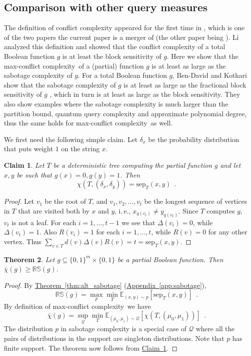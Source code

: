 \documentclass[11pt]{article}
\numberwithin{equation}{section}
\newtheorem{theorem}{Theorem}[section]
\newtheorem{claim}[theorem]{Claim}
\theoremstyle{definition}
\theoremstyle{plain}
\newcommand{\ie}{i.\,e.}
\newcommand{\expref}[2]{\hyperref[#2]{#1~\ref{#2}}}
\newcommand{\clQ}{\mathcal{Q}}
\newcommand{\RS}{\mathbb{RS}}
\newcommand{\sep}{\mathrm{sep}}
\newcommand{\E}{\mathbb{E}}
\newcommand{\ccc}{max-conflict complexity}
\begin{document}
\subsection{Comparison with other query measures}
The definition of conflict complexity appeared for the first time in \cite{DBLP:journals/corr/abs-1801-03285}, which is one of the two papers the current paper is a merger of (the other paper being \cite{DBLP:journals/corr/abs-1801-02226}). Li \cite{Li18} analyzed this definition and showed that the conflict complexity of a total Boolean function $g$ is at least the block sensitivity of $g$. Here we show 
that the \ccc \ of a (partial) function $g$ is at least as large as the sabotage complexity of $g$.  For a total Boolean function $g$, Ben-David 
and Kothari \cite{DBLP:conf/icalp/Ben-DavidK16} show that the sabotage complexity of $g$ is at least as large as the fractional block sensitivity of $g$ \cite{Aar08, Tal13, GSS16}, 
which in turn is at least as large as the block sensitivity.  They also show examples where the sabotage complexity is much larger than the partition bound, quantum query complexity 
and approximate polynomial degree, thus the same holds for \ccc \ as well.  

We first need the following simple claim.  Let $\delta_x$ be the probability distribution that puts weight $1$ on the string $x$.
\begin{claim}
\label{clm:sabotage}
Let $T$ be a deterministic tree computing the partial function $g$ and let $x,y$ be such that $g(x) = 0, g(y) =1$.  Then 
\[
\chi(T, (\delta_x, \delta_y)) = \sep_T(x,y) \enspace .
\]
\end{claim}

\begin{proof}
Let $v_1$ be the root of $T$, and $v_1, v_2, \ldots, v_t$ be the longest sequence of vertices in $T$ that are visited both by $x$ and $y$, \ie, 
$x_{q(v_t)} \ne y_{q(v_t)}$.  Since $T$ computes $g$, $v_t$ is not a leaf. For each $i=1, \ldots, t-1$ we see that $\Delta(v_i) = 0$, while $\Delta(v_t)=1$.  Also $R(v_i)=1$ for each $i=1, \ldots, t$, 
while $R(v)=0$ for any other vertex.  Thus $\sum_{v \in T} d(v) \Delta(v) R(v) = t = \sep_T(x,y)$.  
\end{proof}

\begin{theorem}
Let $g \subseteq \{0,1\}^m \times \{0,1\}$ be a partial
%
Boolean function.  Then $\bar \chi(g) \ge \RS(g)$.  
\end{theorem}

\begin{proof}
By \expref{Theorem}{thm:alt_sabotage} (\expref{Appendix}{app:sabotage}), 
\[
\RS(g) = \max_p \min_T \E_{(x,y) \sim p} [\sep_T(x,y)] \enspace .
\]
By definition of \ccc \ we have
\[
\bar \chi(g) = \sup_{\clQ} \min_T \E_{(\mu_0, \mu_1) \sim \clQ} [\chi(T, (\mu_0, \mu_1))] \enspace .
\]
The distribution $p$ in sabotage complexity is a special case of $\clQ$ where all the pairs of distributions in the support are 
singleton distributions.  Note that $p$ has finite support. The theorem now follows from \expref{Claim}{clm:sabotage}.
\end{proof}
%
\end{document}
